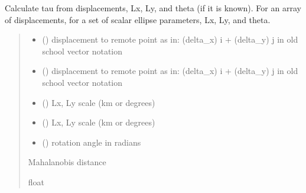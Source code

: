 \documentclass[letterpaper,10pt,english]{sphinxmanual}
\begin{document}
\begin{fulllineitems}
\label{\detokenize{misc:glomar_gridding.distances.mahal_dist_func}}
\pysigstartsignatures
\pysiglinewithargsret
{}
{\sphinxparamcomma {}\sphinxparamcomma {}\sphinxparamcomma {}\sphinxparamcomma {}}
{}
\pysigstopsignatures
\sphinxAtStartPar
Calculate tau from displacements, Lx, Ly, and theta (if it is known). For
an array of displacements, for a set of scalar ellipse parameters, Lx, Ly,
and theta.
\begin{quote}\begin{description}
\begin{itemize}
\item {}
\sphinxAtStartPar
{} () \textendash{} displacement to remote point as in: (delta\_x) i + (delta\_y) j in old
school vector notation

\item {}
\sphinxAtStartPar
{} () \textendash{} displacement to remote point as in: (delta\_x) i + (delta\_y) j in old
school vector notation

\item {}
\sphinxAtStartPar
{} () \textendash{} Lx, Ly scale (km or degrees)

\item {}
\sphinxAtStartPar
{} () \textendash{} Lx, Ly scale (km or degrees)

\item {}
\sphinxAtStartPar
{} (\sphinxstyleliteralemphasis{\sphinxupquote{ | }}) \textendash{} rotation angle in radians

\end{itemize}

\sphinxAtStartPar
{} \textendash{} Mahalanobis distance

\sphinxAtStartPar
float

\end{description}\end{quote}

\end{fulllineitems}
\end{document}
